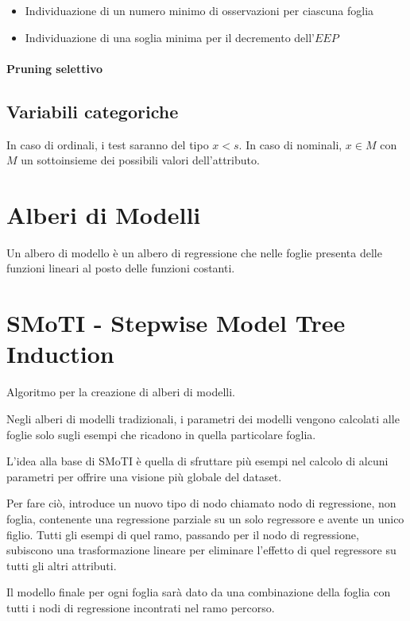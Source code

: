 \documentclass[11pt,onecolumn,a4paper,oneside]{book}
\begin{document}
\begin{itemize}
\item Individuazione di un numero minimo di osservazioni per ciascuna foglia

\item Individuazione di una soglia minima per il decremento dell'$EEP$
\end{itemize}

\paragraph{Pruning selettivo}


\subsection{Variabili categoriche}
In caso di ordinali, i test saranno del tipo $x<s$.
In caso di nominali, $x \in M$ con $M$ un sottoinsieme dei possibili valori dell'attributo.

\section{Alberi di Modelli}
Un albero di modello è un albero di regressione che nelle foglie presenta delle funzioni lineari al posto delle funzioni costanti.

\section{SMoTI - Stepwise Model Tree Induction}
Algoritmo per la creazione di alberi di modelli.

Negli alberi di modelli tradizionali, i parametri dei modelli vengono calcolati alle foglie solo sugli esempi che ricadono in quella particolare foglia.

L'idea alla base di SMoTI è quella di sfruttare più esempi nel calcolo di alcuni parametri per offrire una visione più globale del dataset.

Per fare ciò, introduce un nuovo tipo di nodo chiamato nodo di regressione, non foglia, contenente una regressione parziale su un solo regressore e avente un unico figlio.
Tutti gli esempi di quel ramo, passando per il nodo di regressione, subiscono una trasformazione lineare per eliminare l'effetto di quel regressore su tutti gli altri attributi.

Il modello finale per ogni foglia sarà dato da una combinazione della foglia con tutti i nodi di regressione incontrati nel ramo percorso.
\end{document}
